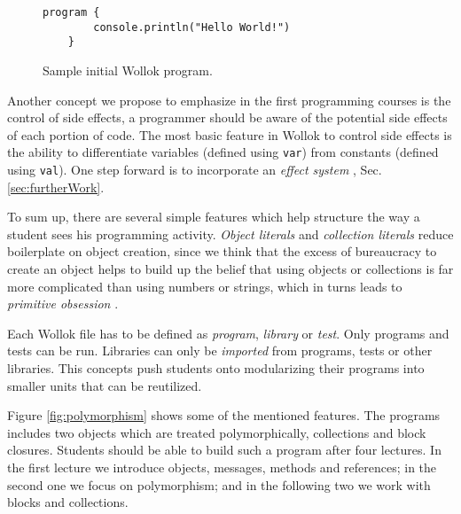 \begin{figure}[ht]
 \centering
 \begin{lstlisting}[language=Wollok]
	program {
		console.println("Hello World!")
	}
 \end{lstlisting}
 
 \caption{\small Sample initial Wollok program.}
 \label{fig:helloWorld/wollok}
\end{figure}

\medskip
Another concept we propose to emphasize in the first programming courses is the control of side effects, 
\ie a programmer should be aware of the potential side effects of each portion of code.
The most basic feature in Wollok to control side effects is the ability to 
differentiate variables (defined using \lstinline[language=Wollok]{var})
from constants (defined using \lstinline[language=Wollok]{val}).
One step forward is to incorporate an \emph{effect system} \cite{nielson_type_1999}, \cf Sec. \ref{sec:furtherWork}.

\medskip
To sum up, there are several simple features which help structure the way a student sees his programming activity.
\emph{Object literals} and \emph{collection literals} reduce boilerplate on object creation, 
since we think that the excess of bureaucracy to create an object helps to build up 
the belief that using objects or collections is far more complicated than using numbers or strings, which in turns leads to \emph{primitive obsession} \cite{fowler_refactoring:_1999}.

Each Wollok file has to be defined as \emph{program}, \emph{library} or \emph{test}.
Only programs and tests can be run. Libraries can only be \emph{imported} from programs, tests or other libraries.
This concepts push students onto modularizing their programs into smaller units that can be reutilized.

Figure \ref{fig:polymorphism} shows some of the mentioned features.
The programs includes two objects which are treated polymorphically, collections and block closures.
Students should be able to build such a program after four lectures.
In the first lecture we introduce objects, messages, methods and references;
in the second one we focus on polymorphism;
and in the following two we work with blocks and collections.


